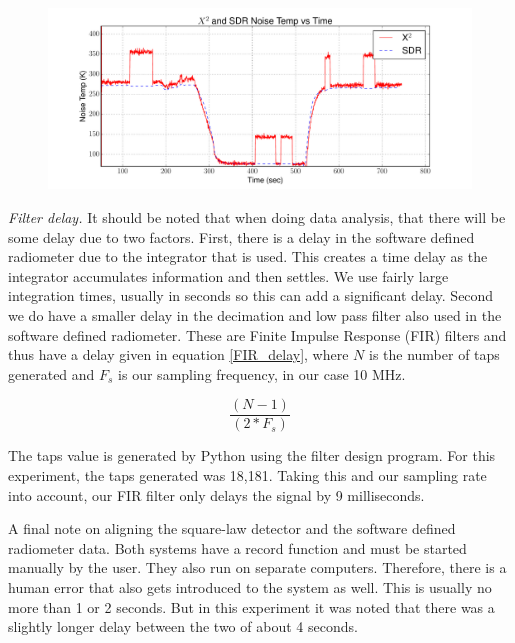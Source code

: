 {\begin{figure}[h!tb] \centering
\includegraphics[width=\textwidth]{Experiments/Exp4/calib_filtered_both.pdf}
\label{filter_on}
\end{figure}

\emph{Filter delay.}  It should be noted that when doing data analysis, that there will be some delay due to two factors.  First, there is a delay in the software defined radiometer due to the integrator that is used.  This creates a time delay as the integrator accumulates information and then settles.  We use fairly large integration times, usually in seconds so this can add a significant delay.  Second we do have a smaller delay in the decimation and low pass filter also used in the software defined radiometer.  These are Finite Impulse Response (FIR) filters and thus have a delay given in equation \ref{FIR_delay}, where $N$ is the number of taps generated and $F_{s}$ is our sampling frequency, in our case 10 MHz.

\begin{equation}\label{FIR_delay}
\frac{(N - 1)}{(2*F_{s})}
\end{equation}

The taps value is generated by Python using the filter design program.  For this experiment, the taps generated was 18,181.  Taking this and our sampling rate into account, our FIR filter only delays the signal by 9 milliseconds.  

A final note on aligning the square-law detector and the software defined radiometer data.  Both systems have a record function and must be started manually by the user.  They also run on separate computers.  Therefore, there is a human error that also gets introduced to the system as well.  This is usually no more than 1 or 2 seconds.  But in this experiment it was noted that there was a slightly longer delay between the two of about 4 seconds.  

}
